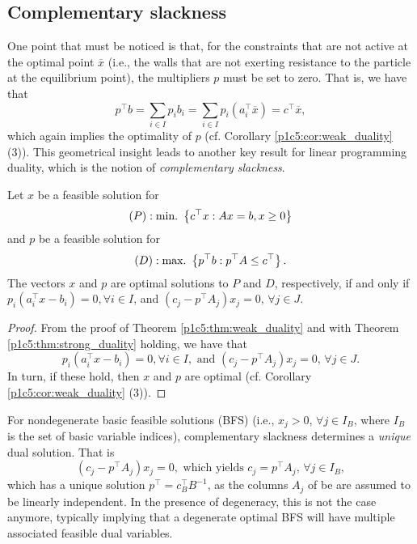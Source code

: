 \subsection{Complementary slackness}

One point that must be noticed is that, for the constraints that are not active at the optimal point $\overline{x}$ (i.e., the walls that are not exerting resistance to the particle at the equilibrium point), the multipliers $p$ must be set to zero. That is, we have that
%
\begin{equation*}
	p^\top b  = \sum_{i \in I} p_ib_i = \sum_{i \in I} p_i(a_i^\top\overline{x}) = c^\top \overline{x},	
\end{equation*}
%
which again implies the optimality of $p$ (cf. Corollary \ref{p1c5:cor:weak_duality} (3)). This geometrical insight leads to another key result for linear programming duality, which is the notion of \emph{complementary slackness}.

\begin{theorem}
	Let $x$ be a feasible solution for 
	\begin{equation*}
		(P) : \mathop{\text{min.~}}\left\{ c^\top x : Ax = b, x \geq 0 \right \}	
	\end{equation*}
	and $p$ be a feasible solution for 
	\begin{equation*}
		(D) : \mathop{\text{max.~}}\left\{ p^\top b : p^\top A \leq c^\top \right \}. 	
	\end{equation*}
	The vectors $x$ and $p$ are optimal solutions to $P$ and $D$, respectively, if and only if
	$p_i(a_i^\top x - b_i) = 0, \forall i \in I$, and $(c_j - p^\top A_j)x_j = 0, \, \forall j \in J$. 
\end{theorem}

\begin{proof} 
	From the proof of Theorem \ref{p1c5:thm:weak_duality} and with Theorem \ref{p1c5:thm:strong_duality} holding, we have that 
%
	\begin{equation*}
		p_i(a_i^\top x - b_i) = 0, \forall i \in I, \text{ and } 	
	(c_j - p^\top A_j)x_j = 0, \, \forall j \in J.
	\end{equation*}
%
	In turn, if these hold, then $x$ and $p$ are optimal (cf. Corollary \ref{p1c5:cor:weak_duality} (3)). 
\end{proof}

For nondegenerate basic feasible solutions (BFS) (i.e., $x_j > 0$, $\forall j \in I_B$, where $I_B$ is the set of basic variable indices), complementary slackness determines a \emph{unique} dual solution. That is
%
\begin{equation*}
	(c_j - p^\top A_j)x_j = 0, \text{ which yields } c_j = p^\top A_j, \, \forall j \in I_B,
\end{equation*}
%
which has a unique solution $p^\top = c_B^\top B^{-1}$, as the columns $A_j$ of be are assumed to be linearly independent. In the presence of degeneracy, this is not the case anymore, typically implying that a degenerate optimal BFS will have multiple associated feasible dual variables.


